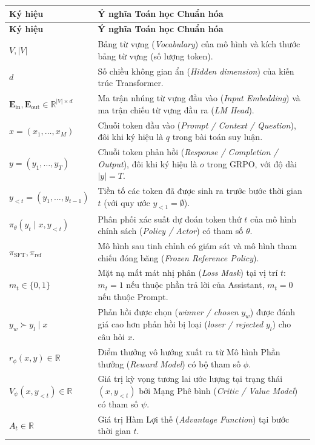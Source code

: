 \documentclass[11pt,a4paper,oneside]{report}
\theoremstyle{plain}
\theoremstyle{definition}
\theoremstyle{remark}
\begin{document}
\begin{longtable}{p{3.2cm} p{11.8cm}}
\toprule
\textbf{Ký hiệu} & \textbf{Ý nghĩa Toán học Chuẩn hóa} \\
\midrule
\endfirsthead
\toprule
\textbf{Ký hiệu} & \textbf{Ý nghĩa Toán học Chuẩn hóa} \\
\midrule
\endhead
\bottomrule
\endfoot
$V, |V|$ & Bảng từ vựng (\textit{Vocabulary}) của mô hình và kích thước bảng từ vựng (số lượng token). \\
$d$ & Số chiều không gian ẩn (\textit{Hidden dimension}) của kiến trúc Transformer. \\
$\mathbf{E}_{\text{in}}, \mathbf{E}_{\text{out}} \in \mathbb{R}^{|V| \times d}$ & Ma trận nhúng từ vựng đầu vào (\textit{Input Embedding}) và ma trận chiếu từ vựng đầu ra (\textit{LM Head}). \\
$x = (x_1, \dots, x_M)$ & Chuỗi token đầu vào (\textit{Prompt / Context / Question}), đôi khi ký hiệu là $q$ trong bài toán suy luận. \\
$y = (y_1, \dots, y_T)$ & Chuỗi token phản hồi (\textit{Response / Completion / Output}), đôi khi ký hiệu là $o$ trong GRPO, với độ dài $|y| = T$. \\
$y_{<t} = (y_1, \dots, y_{t-1})$ & Tiền tố các token đã được sinh ra trước bước thời gian $t$ (với quy ước $y_{<1} = \emptyset$). \\
$\pi_\theta(y_t \mid x, y_{<t})$ & Phân phối xác suất dự đoán token thứ $t$ của mô hình chính sách (\textit{Policy / Actor}) có tham số $\theta$. \\
$\pi_{\text{SFT}}, \pi_{\text{ref}}$ & Mô hình sau tinh chỉnh có giám sát và mô hình tham chiếu đóng băng (\textit{Frozen Reference Policy}). \\
$m_t \in \{0, 1\}$ & Mặt nạ mất mát nhị phân (\textit{Loss Mask}) tại vị trí $t$: $m_t = 1$ nếu thuộc phần trả lời của Assistant, $m_t = 0$ nếu thuộc Prompt. \\
$y_w \succ y_l \mid x$ & Phản hồi được chọn (\textit{winner / chosen} $y_w$) được đánh giá cao hơn phản hồi bị loại (\textit{loser / rejected} $y_l$) cho câu hỏi $x$. \\
$r_\phi(x, y) \in \mathbb{R}$ & Điểm thưởng vô hướng xuất ra từ Mô hình Phần thưởng (\textit{Reward Model}) có bộ tham số $\phi$. \\
$V_\psi(x, y_{<t}) \in \mathbb{R}$ & Giá trị kỳ vọng tương lai ước lượng tại trạng thái $(x, y_{<t})$ bởi Mạng Phê bình (\textit{Critic / Value Model}) có tham số $\psi$. \\
$A_t \in \mathbb{R}$ & Giá trị Hàm Lợi thế (\textit{Advantage Function}) tại bước thời gian $t$. \\

\end{longtable}
\end{document}
